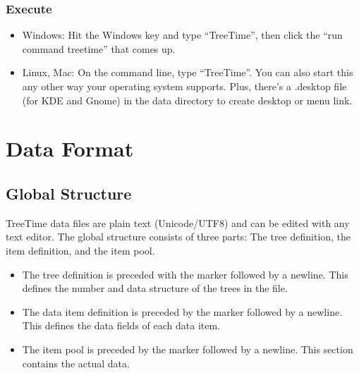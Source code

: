 \documentclass[letterpaper,10pt,english]{sphinxmanual}
\begin{document}
\subsection{Execute}
\label{\detokenize{introduction:execute}}\begin{itemize}
\item {} 
\sphinxAtStartPar
Windows: Hit the Windows key and type “TreeTime”, then click the “run command treetime” that comes up.

\item {} 
\sphinxAtStartPar
Linux, Mac: On the command line, type “TreeTime”. You can also start this any other way your operating system supports. Plus, there’s a .desktop file (for KDE and Gnome) in the data directory to create desktop or menu link.

\end{itemize}

\sphinxstepscope


\chapter{Data Format}
\label{\detokenize{data-format:data-format}}\label{\detokenize{data-format::doc}}

\section{Global Structure}
\label{\detokenize{data-format:global-structure}}
\sphinxAtStartPar
TreeTime data files are plain text (Unicode/UTF8) and can be edited with any text editor. The global structure consists of three parts: The tree definition, the item definition, and the item pool.
\begin{itemize}
\item {} 
\sphinxAtStartPar
The tree definition is preceded with the marker  followed by a newline. This defines the number and data structure of the trees in the file.

\item {} 
\sphinxAtStartPar
The data item definition is preceded by the marker  followed by a newline. This defines the data fields of each data item.

\item {} 
\sphinxAtStartPar
The item pool is preceded by the marker  followed by a newline. This section contains the actual data.

\end{itemize}
\end{document}
